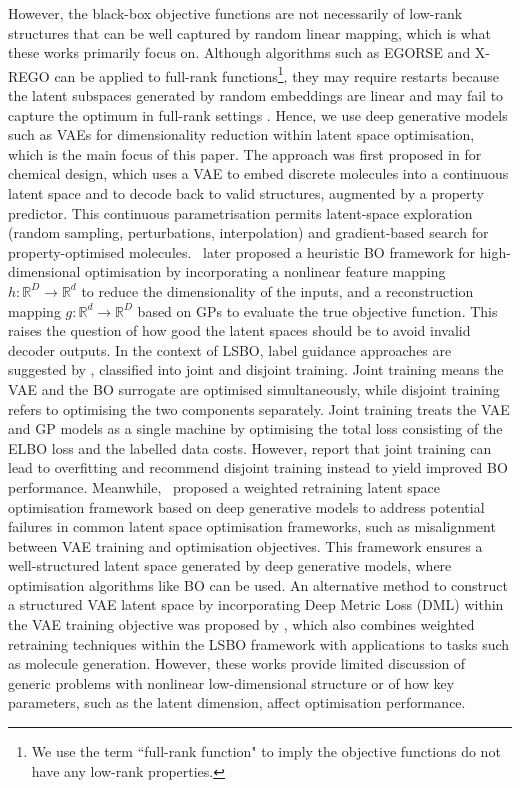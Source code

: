 \documentclass[pdflatex,sn-mathphys-num]{sn-jnl}%
\theoremstyle{thmstyleone}%
\theoremstyle{thmstyletwo}%
\theoremstyle{thmstylethree}%
\begin{document}
However, the black-box objective functions are not necessarily of low-rank structures that can be well captured by random linear mapping, which is what these works primarily focus on. Although algorithms such as EGORSE and X-REGO can be applied to full-rank functions\footnote{We use the term ``full-rank function" to imply the objective functions do not have any low-rank properties.}, they may require restarts because the latent subspaces generated by random embeddings are linear and may fail to capture the optimum in full-rank settings \cite{Wang2013, cartis2021globaloptimizationusingrandom}. Hence,  we use deep generative models such as VAEs for dimensionality reduction within latent space optimisation, which is the main focus of this paper. The approach was first proposed in \cite{G_mez_Bombarelli_2018} for chemical design, which uses a VAE to embed discrete molecules into a continuous latent space and to decode back to valid structures, augmented by a property predictor. This continuous parametrisation permits latent-space exploration (random sampling, perturbations, interpolation) and gradient-based search for property-optimised molecules. \citet{Moriconi2020}\ later proposed a heuristic BO framework for high-dimensional optimisation by incorporating a nonlinear feature mapping $h: \mathbb{R}^D \to \mathbb{R}^d$ to reduce the dimensionality of the inputs, and a reconstruction mapping $g: \mathbb{R}^d \to \mathbb{R}^D$ based on GPs to evaluate the true objective function. This raises the question of how good the latent spaces should be to avoid invalid decoder outputs. In the context of LSBO, label guidance approaches are suggested by \citet{Siivola2020}, classified into joint and disjoint training.  Joint training means the VAE and the BO surrogate are optimised simultaneously, while disjoint training refers to optimising the two components separately. Joint training treats the VAE and GP models as a single machine by optimising the total loss consisting of the ELBO loss and the labelled data costs. However, \citet{Siivola2020} report that joint training can lead to overfitting and recommend disjoint training instead to yield improved BO performance. Meanwhile, \citet{Tripp2020}\ proposed a weighted retraining latent space optimisation framework based on deep generative models to address potential failures in common latent space optimisation frameworks, such as misalignment between VAE training and optimisation objectives. This framework ensures a well-structured latent space generated by deep generative models, where optimisation algorithms like BO can be used. An alternative method to construct a structured VAE latent space by incorporating Deep Metric Loss (DML) within the VAE training objective was proposed by \citet{grosnit2021highdimensionalbayesianoptimisationvariational}, which also combines weighted retraining techniques within the LSBO framework with applications to tasks such as molecule generation. However, these works provide limited discussion of generic problems with nonlinear low-dimensional structure or of how key parameters, such as the latent dimension, affect optimisation performance.\\
\end{document}
